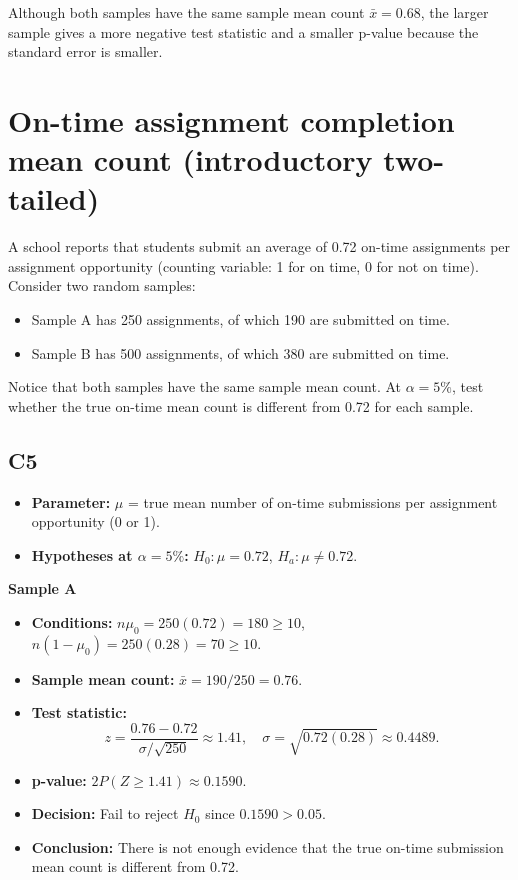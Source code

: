 \begin{center}
\end{center}


Although both samples have the same sample mean count \(\bar x=0.68\), the larger sample gives a more negative test statistic and a smaller p-value because the standard error is smaller.
\section{On-time assignment completion mean count (introductory two-tailed)}
A school reports that students submit an average of 0.72 on-time assignments per assignment opportunity (counting variable: 1 for on time, 0 for not on time). Consider two random samples:
\begin{itemize}
	\item Sample A has 250 assignments, of which 190 are submitted on time.
	\item Sample B has 500 assignments, of which 380 are submitted on time.
\end{itemize}
Notice that both samples have the same sample mean count. At \(\alpha=5\%\), test whether the true on-time mean count is different from 0.72 for each sample.

\subsection*{C5}
\begin{itemize}
	\item \textbf{Parameter:} \(\mu\) = true mean number of on-time submissions per assignment opportunity (0 or 1).
	\item \textbf{Hypotheses at \(\alpha=5\%\):} \(H_0\colon \mu=0.72\), \(H_a\colon \mu\ne0.72\).
\end{itemize}

\textbf{Sample A}

\begin{itemize}
	\item \textbf{Conditions:} \(n\mu_0=250(0.72)=180\ge10\), \(n(1-\mu_0)=250(0.28)=70\ge10\).
	\item \textbf{Sample mean count:} \(\bar x=190/250=0.76\).
	\item \textbf{Test statistic:}
	\[
	z=\frac{0.76-0.72}{\sigma/\sqrt{250}}\approx 1.41,\quad \sigma=\sqrt{0.72(0.28)}\approx0.4489.
	\]
	\item \textbf{p-value:} \(2P(Z\ge 1.41)\approx 0.1590\).
	\item \textbf{Decision:} Fail to reject \(H_0\) since \(0.1590>0.05\).
	\item \textbf{Conclusion:} There is not enough evidence that the true on-time submission mean count is different from 0.72.
\end{itemize}

